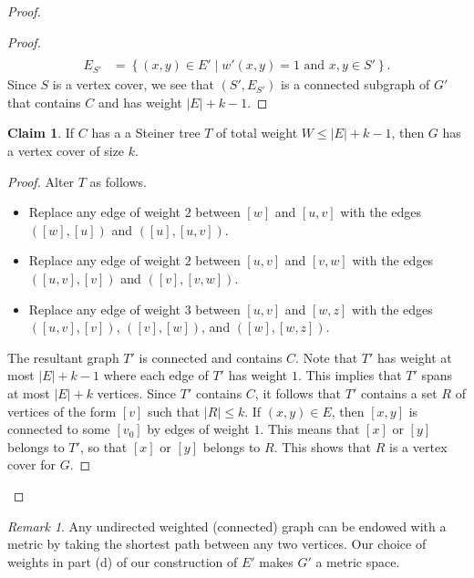 \documentclass[10pt,letterpaper,cm]{nupset}
\theoremstyle{definition}
\theoremstyle{theorem}
\newtheorem*{claim}{Claim}
\theoremstyle{remark}
\newtheorem{remark}[definition]{Remark}
\newcommand{\1}{\mathbf{1}}
\newcommand{\0}{\vec 0}
\begin{document}
\begin{proof}
\begin{proof}
\begin{align*}
\\ E_{S'} & = \left\{ \left(x,y\right)\in E' \mid w'\left(x,y\right)=1 \text{ and } x,y\in S'\right\}.
\end{align*} Since $S$ is a vertex cover, we see that $\left(S', E_{S'}\right)$ is a connected subgraph of $G'$ that contains $C$ and has weight $\left\lvert{E}\right\rvert+k -1$.
\end{proof}
\begin{claim}
If $C$ has a a Steiner tree $T$ of total weight $W \leq \left\lvert{E}\right\rvert +k -1$, then $G$ has a vertex cover of size $k$. 
\end{claim}
\begin{proof}
Alter $T$ as follows.
\begin{itemize}
\item Replace any edge of weight $2$ between $\left[w\right]$ and $\left[u,v\right]$ with the edges $\left(\left[w\right], \left[u\right]\right)$ and $\left(\left[u\right], \left[u,v\right]\right)$.
\item Replace any edge of weight $2$ between $\left[u,v\right]$ and $\left[v,w\right]$ with the edges $\left(\left[u,v\right], \left[v\right]\right)$ and $\left(\left[v\right], \left[v,w\right]\right)$.
\item Replace any edge of weight $3$ between $\left[u,v\right]$ and $\left[w,z\right]$ with the edges $\left(\left[u,v\right], \left[v\right]\right)$, $\left(\left[v\right], \left[w\right]\right)$, and $\left(\left[w\right], \left[w,z\right]\right)$.
\end{itemize}
The resultant graph $T'$ is connected and contains $C$. Note that $T'$ has weight at most $\left\lvert{E}\right\rvert + k -1$ where each edge of $T'$ has weight $1$. This implies that $T'$ spans at most $\left\lvert{E}\right\rvert +k$ vertices. Since $T'$ contains $C$, it follows that $T'$ contains a set $R$ of vertices of the form $\left[v\right]$ such that $\left\lvert{R}\right\rvert\leq k$. If $\left(x,y\right)\in E$, then $\left[x,y\right]$ is connected to some $\left[v_0\right]$ by edges of weight $1$. This means that $\left[x\right]$ or $\left[y\right]$ belongs to $T'$, so that $\left[x\right]$ or $\left[y\right]$ belongs to $R$. This shows that $R$ is a vertex cover for $G$.
\end{proof}
\end{proof}

\begin{remark}
Any undirected  weighted (connected) graph can be endowed with a metric by taking the shortest path between any two vertices. Our choice of weights in part (d) of our construction of $E'$ makes $G'$ a metric space. 
\end{remark}
\end{document}
